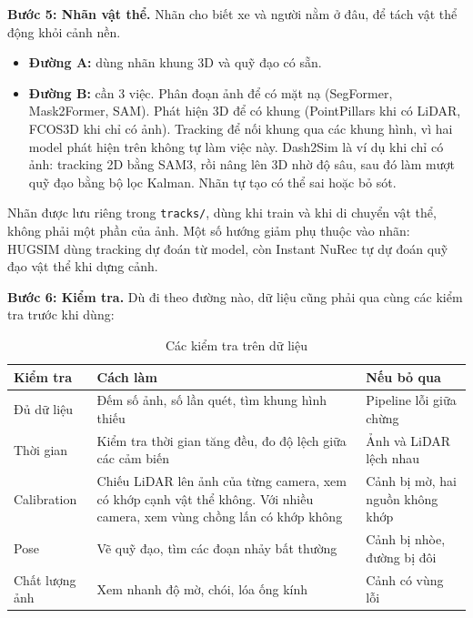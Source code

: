 \textbf{Bước 5: Nhãn vật thể.}
Nhãn cho biết xe và người nằm ở đâu, để tách vật thể động khỏi cảnh nền.
\begin{itemize}
  \item \textbf{Đường A:} dùng nhãn khung 3D và quỹ đạo có sẵn.
  \item \textbf{Đường B:} cần 3 việc. Phân đoạn ảnh để có mặt nạ (SegFormer, Mask2Former, SAM). Phát hiện 3D để có khung (PointPillars khi có LiDAR, FCOS3D khi chỉ có ảnh). Tracking để nối khung qua các khung hình, vì hai model phát hiện trên không tự làm việc này. Dash2Sim là ví dụ khi chỉ có ảnh: tracking 2D bằng SAM3, rồi nâng lên 3D nhờ độ sâu, sau đó làm mượt quỹ đạo bằng bộ lọc Kalman. Nhãn tự tạo có thể sai hoặc bỏ sót.
\end{itemize}

Nhãn được lưu riêng trong \texttt{tracks/}, dùng khi train và khi di chuyển vật thể, không phải một phần của ảnh.
Một số hướng giảm phụ thuộc vào nhãn: HUGSIM dùng tracking dự đoán từ model, còn Instant NuRec tự dự đoán quỹ đạo vật thể khi dựng cảnh.

\textbf{Bước 6: Kiểm tra.}
Dù đi theo đường nào, dữ liệu cũng phải qua cùng các kiểm tra trước khi dùng:

\begin{table}[H]
  \centering
  \small
  \caption{Các kiểm tra trên dữ liệu}
  \begin{tabularx}{\linewidth}{>{\raggedright\arraybackslash}p{3.1cm} >{\raggedright\arraybackslash}X >{\raggedright\arraybackslash}X}
    \toprule
    \textbf{Kiểm tra} & \textbf{Cách làm} & \textbf{Nếu bỏ qua} \\
    \midrule
    Đủ dữ liệu & Đếm số ảnh, số lần quét, tìm khung hình thiếu & Pipeline lỗi giữa chừng \\
    \addlinespace
    Thời gian & Kiểm tra thời gian tăng đều, đo độ lệch giữa các cảm biến & Ảnh và LiDAR lệch nhau \\
    \addlinespace
    Calibration & Chiếu LiDAR lên ảnh của từng camera, xem có khớp cạnh vật thể không. Với nhiều camera, xem vùng chồng lấn có khớp không & Cảnh bị mờ, hai nguồn không khớp \\
    \addlinespace
    Pose & Vẽ quỹ đạo, tìm các đoạn nhảy bất thường & Cảnh bị nhòe, đường bị đôi \\
    \addlinespace
    Chất lượng ảnh & Xem nhanh độ mờ, chói, lóa ống kính & Cảnh có vùng lỗi \\
    \bottomrule
  \end{tabularx}
\end{table}

